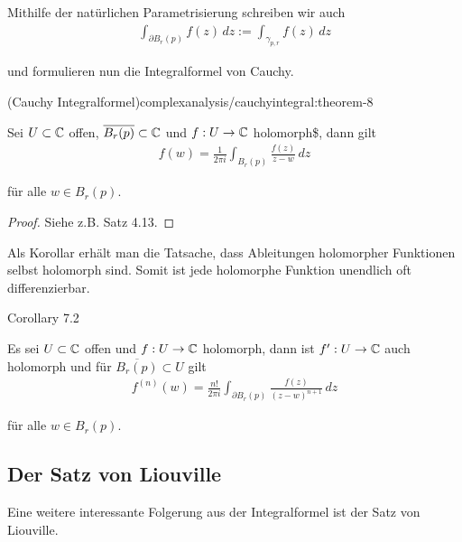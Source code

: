 \par
Mithilfe der natürlichen Parametrisierung schreiben wir auch
\begin{align*}
\int_{\partial B_r(p)} f(z)\, dz := \int_{\gamma_{p,r}} f(z)\, dz
\end{align*}
\par
und formulieren nun die Integralformel von Cauchy.
\begin{theorem}{(Cauchy Integralformel)}{complexanalysis/cauchyintegral:theorem-8}



\par
Sei \(U \subset \mathbb{C}\) offen, \(\overline{B_r(p)}\subset \mathbb{C}\) und \(f:U\to \mathbb{C}\) holomorph\$, dann gilt
\begin{align*}
f(w) = \frac{1}{2\pi i} \int_{B_r(p)} \frac{f(z)}{z-w}\, dz
\end{align*}
\par
für alle \(w\in B_r(p)\).
\end{theorem}

\begin{proof}
 Siehe z.B. \cite{Nee17} Satz 4.13.
\end{proof}

\par
Als Korollar erhält man die Tatsache, dass Ableitungen holomorpher Funktionen selbst holomorph sind. Somit ist jede holomorphe Funktion unendlich oft differenzierbar.
\label{complexanalysis/cauchyintegral:cor:infholo}
\begin{emphBox}{}{}{Corollary 7.2}



\par
Es sei \(U\subset\mathbb{C}\) offen und \(f:U\to\mathbb{C}\) holomorph, dann ist \(f^\prime:U\to\mathbb{C}\) auch holomorph und für \(\overline{B_r(p)}\subset U\) gilt
\begin{align*}
f^{(n)}(w) = \frac{n!}{2\pi i} \int_{\partial B_r(p)} \frac{f(z)}{(z-w)^{n+1}}\, dz
\end{align*}
\par
für alle \(w\in B_r(p)\).
\end{emphBox}


\subsection{Der Satz von Liouville}
\label{\detokenize{complexanalysis/cauchyintegral:der-satz-von-liouville}}
\par
Eine weitere interessante Folgerung aus der Integralformel ist der Satz von Liouville.

